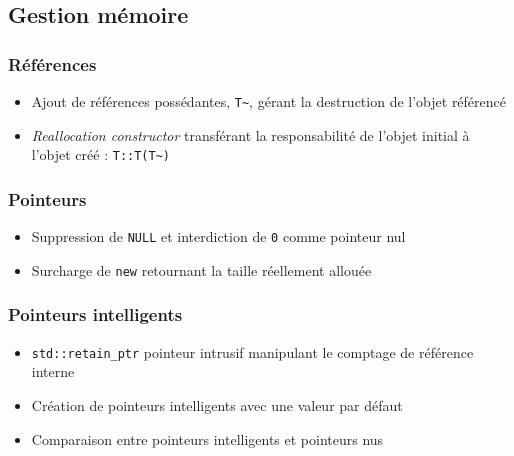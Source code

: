 \documentclass[C++.tex]{subfiles}
\begin{document}
\subsection*{Gestion mémoire}
\begin{frame}[fragile]
	\frametitle{Références}
	\begin{itemize}
		\item Ajout de références possédantes, \lstinline|T~|, gérant la destruction de l'objet référencé
		\item \textit{Reallocation constructor} transférant la responsabilité de l'objet initial à l'objet créé : \lstinline|T::T(T~)|
	\end{itemize}
\end{frame}

\begin{frame}[fragile]
	\frametitle{Pointeurs}
	\begin{itemize}
		\item Suppression de \lstinline|NULL| et interdiction de \lstinline|0| comme pointeur nul
		\item Surcharge de \lstinline|new| retournant la taille réellement allouée
	\end{itemize}
\end{frame}

\begin{frame}[fragile]
	\frametitle{Pointeurs intelligents}
	\begin{itemize}
		\item \lstinline|std::retain_ptr| pointeur intrusif manipulant le comptage de référence interne
		\item Création de pointeurs intelligents avec une valeur par défaut
		\item Comparaison entre pointeurs intelligents et pointeurs nus
	\end{itemize}
\end{frame}
\end{document}
